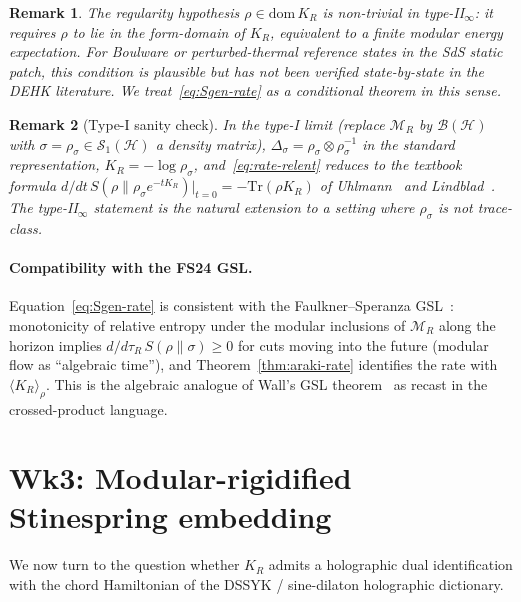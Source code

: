 \documentclass[12pt,a4paper]{article}
\newtheorem{remark}{Remark}
\theoremstyle{definition}
\begin{document}
\begin{remark}
The regularity hypothesis $\rho\in\mathrm{dom}\,K_R$ is non-trivial in
type-II$_\infty$: it requires $\rho$ to lie in the form-domain of $K_R$,
equivalent to a finite \emph{modular energy} expectation. For Boulware
or perturbed-thermal reference states in the SdS static patch, this
condition is plausible but has not been verified state-by-state in the
DEHK literature. We treat~\eqref{eq:Sgen-rate} as a conditional theorem
in this sense.
\end{remark}

\begin{remark}[Type-I sanity check]
In the type-I limit (replace $\mathcal{M}_R$ by $\mathcal{B}(\mathcal{H})$
with $\sigma=\rho_\sigma\in\mathcal{S}_1(\mathcal{H})$ a density matrix),
$\Delta_\sigma=\rho_\sigma\otimes\rho_\sigma^{-1}$ in the standard
representation, $K_R=-\log\rho_\sigma$, and~\eqref{eq:rate-relent}
reduces to the textbook formula
$d/dt\,S(\rho\|\rho_\sigma e^{-tK_R})|_{t=0}=-\mathrm{Tr}(\rho K_R)$
of Uhlmann~\cite{Uhlmann1977} and Lindblad~\cite{Lindblad1974}. The
type-II$_\infty$ statement is the natural extension to a setting where
$\rho_\sigma$ is not trace-class.
\end{remark}

\paragraph{Compatibility with the FS24 GSL.}
Equation~\eqref{eq:Sgen-rate} is consistent with the Faulkner--Speranza
GSL~\cite{FaulknerSperanza2024}: monotonicity of relative entropy under
the modular inclusions of $\mathcal{M}_R$ along the horizon implies
$d/d\tau_R\,S(\rho\|\sigma)\geq 0$ for cuts moving into the future
(modular flow as ``algebraic time''), and Theorem~\ref{thm:araki-rate}
identifies the rate with $\langle K_R\rangle_\rho$. This is the
algebraic analogue of Wall's GSL theorem~\cite{Wall2012} as recast in
the crossed-product language.

\section{Wk3: Modular-rigidified Stinespring embedding}
\label{sec:stinespring}

We now turn to the question whether $K_R$ admits a holographic dual
identification with the chord Hamiltonian of the DSSYK / sine-dilaton
holographic dictionary.
\end{document}
